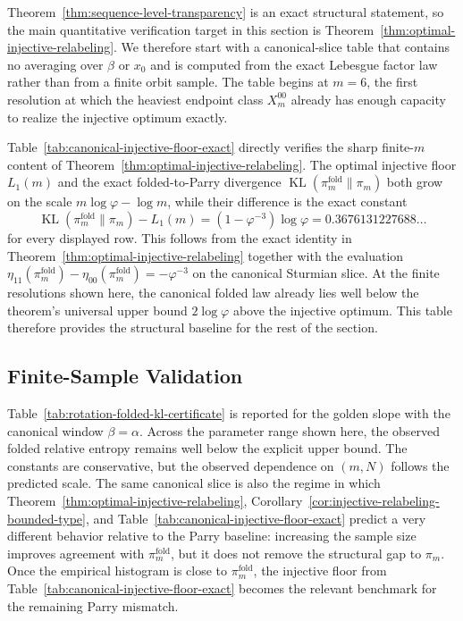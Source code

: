 \documentclass[11pt,letterpaper]{article}
\numberwithin{equation}{section}
\theoremstyle{plain}
\theoremstyle{definition}
\theoremstyle{remark}
\DeclareMathOperator{\KL}{KL}
\begin{document}
Theorem~\ref{thm:sequence-level-transparency} is an exact structural statement,
so the main quantitative verification target in this section is
Theorem~\ref{thm:optimal-injective-relabeling}. We therefore start with a
canonical-slice table that contains no averaging over \(\beta\) or \(x_0\) and
is computed from the exact Lebesgue factor law rather than from a finite orbit
sample. The table begins at \(m=6\), the first resolution at which the heaviest
endpoint class \(X_m^{00}\) already has enough capacity to realize the injective
optimum exactly.



Table~\ref{tab:canonical-injective-floor-exact} directly verifies the sharp
finite-\(m\) content of Theorem~\ref{thm:optimal-injective-relabeling}. The
optimal injective floor \(L_1(m)\) and the exact folded-to-Parry divergence
\(\KL(\pi_m^{\mathrm{fold}}\|\pi_m)\) both grow on the scale
\(m\log\varphi-\log m\), while their difference is the exact constant
\[
\KL(\pi_m^{\mathrm{fold}}\|\pi_m)-L_1(m)
=
(1-\varphi^{-3})\log\varphi
=
0.3676131227688\ldots
\]
for every displayed row. This follows from the exact identity in
Theorem~\ref{thm:optimal-injective-relabeling} together with the evaluation
\(\eta_{11}(\pi_m^{\mathrm{fold}})-\eta_{00}(\pi_m^{\mathrm{fold}})
=-\varphi^{-3}\) on the canonical Sturmian slice.
At the finite resolutions shown here, the canonical folded law already lies
well below the theorem's universal upper bound \(2\log\varphi\) above the
injective optimum. This table therefore provides the structural baseline for
the rest of the section.

\subsection{Finite-Sample Validation}



Table~\ref{tab:rotation-folded-kl-certificate} is reported for the golden slope
with the canonical window \(\beta=\alpha\). Across the parameter range shown
here, the observed folded relative entropy remains well below the explicit
upper bound. The constants are conservative, but the observed dependence on
\((m,N)\) follows the predicted scale. The same canonical slice is also the
regime in which Theorem~\ref{thm:optimal-injective-relabeling},
Corollary~\ref{cor:injective-relabeling-bounded-type}, and
Table~\ref{tab:canonical-injective-floor-exact} predict a very different
behavior relative to the Parry baseline: increasing the sample size improves
agreement with \(\pi_m^{\mathrm{fold}}\), but it does not remove the structural
gap to \(\pi_m\). Once the empirical histogram is close to
\(\pi_m^{\mathrm{fold}}\), the injective floor from
Table~\ref{tab:canonical-injective-floor-exact} becomes the relevant benchmark
for the remaining Parry mismatch.
\end{document}
